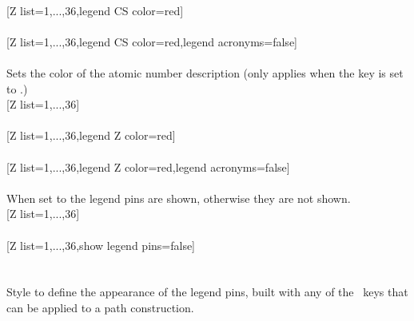 \\ [10pt][Z list={1,...,36},legend CS color=red]%
\\ [10pt]\makebox[\linewidth][c]{\scalebox{.6}{\pgfPT[Z list={1,...,36},legend CS color=red]}}%
\\ [10pt][Z list={1,...,36},legend CS color=red,legend acronyms=false]%
\\ [10pt]\makebox[\linewidth][c]{\scalebox{.6}{\pgfPT[Z list={1,...,36},legend CS color=red,legend acronyms=false]}}%
\\ [0pt]\pgfPTendoption%
\label{option_legend Z color}%
%
{Sets the color of the atomic number description (only applies when the key  is set to .)}%
\\ [5pt][Z list={1,...,36}]%
\\ [5pt]\makebox[\linewidth][c]{\scalebox{.6}{\pgfPT[Z list={1,...,36}]}}%
\\ [10pt][Z list={1,...,36},legend Z color=red]%
\\ [5pt]\makebox[\linewidth][c]{\scalebox{.6}{\pgfPT[Z list={1,...,36},legend Z color=red]}}%
\\ [10pt][Z list={1,...,36},legend Z color=red,legend acronyms=false]%
\\ [5pt]\makebox[\linewidth][c]{\scalebox{.6}{\pgfPT[Z list={1,...,36},legend Z color=red,legend acronyms=false]}}%
\\ [0pt]\pgfPTendoption%
\label{option_show legend pins}%
%
{When set to  the legend pins are shown, otherwise they are not shown.}%
\\ [5pt][Z list={1,...,36}]%
\\ [10pt]\makebox[\linewidth][c]{\scalebox{.6}{\pgfPT[Z list={1,...,36}]}}%
\\ [5pt][Z list={1,...,36},show legend pins=false]%
\\ [10pt]\makebox[\linewidth][c]{\scalebox{.6}{\pgfPT[Z list={1,...,36},show legend pins=false]}}%
\\ [0pt]\pgfPTendoption%
\label{style_legend pins}%
%
{\ \\ [4pt]Style to define the appearance of the legend pins, built with any of the \txttikz\ keys that can be applied to a path construction.}%
